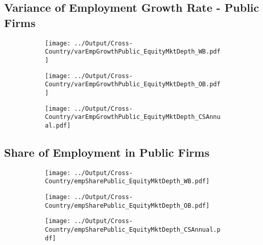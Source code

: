 \documentclass[12pt,notitlepage]{article}
\begin{document}
\subsection{Variance of Employment Growth Rate - Public Firms}
\begin{figure}[!htpb]
\centering
\begin{subfigure}{.49\textwidth}
    \centering
 \texttt{[image: ../Output/Cross-Country/varEmpGrowthPublic\_EquityMktDepth\_WB.pdf]}
\end{subfigure}
\begin{subfigure}{.49\textwidth}
    \centering
  \texttt{[image: ../Output/Cross-Country/varEmpGrowthPublic\_EquityMktDepth\_OB.pdf]}
\end{subfigure}
\begin{subfigure}{.49\textwidth}
    \centering
  \texttt{[image: ../Output/Cross-Country/varEmpGrowthPublic\_EquityMktDepth\_CSAnnual.pdf]}
\end{subfigure}
\end{figure}
\pagebreak

\subsection{Share of Employment in Public Firms}
\begin{figure}[!htpb]
\centering
\begin{subfigure}{.49\textwidth}
    \centering
 \texttt{[image: ../Output/Cross-Country/empSharePublic\_EquityMktDepth\_WB.pdf]}
\end{subfigure}
\begin{subfigure}{.49\textwidth}
    \centering
  \texttt{[image: ../Output/Cross-Country/empSharePublic\_EquityMktDepth\_OB.pdf]}
\end{subfigure}
\begin{subfigure}{.49\textwidth}
    \centering
  \texttt{[image: ../Output/Cross-Country/empSharePublic\_EquityMktDepth\_CSAnnual.pdf]}
\end{subfigure}
\end{figure}
\pagebreak
\end{document}

